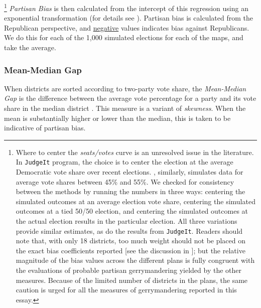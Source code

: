     	\footnote{Where to center the \textit{seats/votes} curve is an unresolved issue in the literature. In \citet{GelmanKing1994_unifiedAJPS} \texttt{JudgeIt} program, the choice is to center the election at the average Democratic vote share over recent elections. \citet{Kastellec_et_al_2008_PS}, similarly, simulates data for average vote shares between 45\% and 55\%. We checked for consistency between the methods by running the numbers in three ways: centering the simulated outcomes at an average election vote share, centering the simulated outcomes at a tied 50/50 election, and centering the simulated outcomes at the actual election results in the particular election. All three variations provide similar estimates, as do the results from \texttt{JudgeIt}. Readers should note that, with only 18 districts, too much weight should not be placed on the exact bias coefficients reported [see the discussion in \citet{Browning_King_1987_seats_votes}]; but the relative magnitude of the bias values across the different plans is fully congruent with the evaluations of probable partisan gerrymandering yielded by the other measures. Because of the limited number of districts in the plans, the same caution is urged for all the measures of gerrymandering reported in this essay.} 
    \textit{Partisan Bias} is then calculated from the intercept of this regression using an exponential transformation (for details see \citet{Grofman1983}). Partisan bias is calculated from the Republican perspective, and \underline{negative} values indicates bias against Republicans. We do this for each of the 1,000 simulated elections for each of the maps, and take the average.
\par
            \subsubsection*{Mean-Median Gap}
    When districts are sorted according to two-party vote share, the \textit{Mean-Median Gap} is the difference between the average vote percentage for a party and its vote share in the median district \citep[see][]{Best2018}. This measure is a variant of \textit{skewness}. When the mean is substantially higher or lower than the median, this is taken to be indicative of partisan bias.
\par
